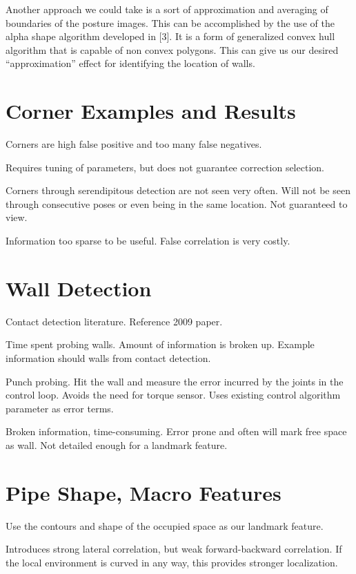 Another approach we could take is a sort of approximation and averaging of boundaries of the posture images. This can be accomplished by the use of the alpha shape algorithm developed in [3]. It is a form of generalized convex hull algorithm that is capable of non convex polygons. This can give us our desired “approximation” effect for identifying the location of walls.

\section{Corner Examples and Results}
\label{cornerexamplesandresults}

Corners are high false positive and too many false negatives.

Requires tuning of parameters, but does not guarantee correction selection.

Corners through serendipitous detection are not seen very often. Will not be seen through consecutive poses or even being in the same location. Not guaranteed to view.

Information too sparse to be useful. False correlation is very costly.

\section{Wall Detection}
\label{walldetection}

Contact detection literature. Reference 2009 paper.

Time spent probing walls. Amount of information is broken up. Example information should walls from contact detection.

Punch probing. Hit the wall and measure the error incurred by the joints in the control loop. Avoids the need for torque sensor. Uses existing control algorithm parameter as error terms.

Broken information, time-consuming. Error prone and often will mark free space as wall. Not detailed enough for a landmark feature.

\section{Pipe Shape, Macro Features}
\label{pipeshapemacrofeatures}

Use the contours and shape of the occupied space as our landmark feature. 

Introduces strong lateral correlation, but weak forward-backward correlation. If the local environment is curved in any way, this provides stronger localization.

